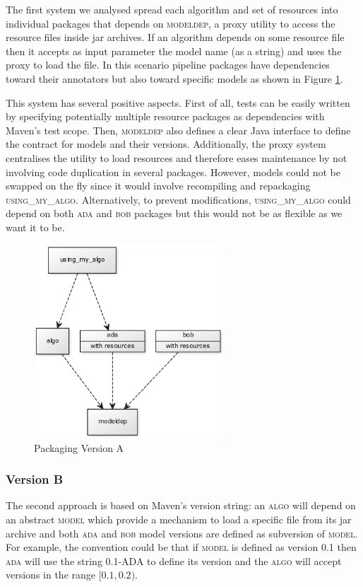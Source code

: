 \documentclass{article}
\newcommand{\id}[1]{\mbox{\textsc{#1}}}
\begin{document}
The first system we analysed spread each algorithm and set of resources into individual packages that depends on \id{modeldep}, a proxy utility to access the resource files inside jar archives. If an algorithm depends on some resource file then it accepts as input parameter the model name (as a string) and uses the proxy to load the file. In this scenario pipeline packages have dependencies toward their annotators but also toward specific models as shown in Figure \ref{fig:pkgsysA}.

This system has several positive aspects. First of all, tests can be easily written by specifying potentially multiple resource packages as dependencies with Maven's test scope. Then, \id{modeldep} also defines a clear Java interface to define the contract for models and their versions. Additionally, the proxy system centralises the utility to load resources and therefore eases maintenance by not involving code duplication in several packages. However, models could not be swapped on the fly since it would involve recompiling and repackaging \id{using\_my\_algo}.  Alternatively, to prevent modifications, \id{using\_my\_algo} could depend on both \id{ada} and \id{bob} packages but this would not be as flexible as we want it to be.

\begin{figure}
\centering
\includegraphics[width=200pt]{res/packaging_version_A.png}
\caption{Packaging Version A}
\label{fig:pkgsysA}
\end{figure}


\subsubsection{Version B}

The second approach is based on Maven's version string: an \id{algo} will depend on an abstract \id{model} which provide a mechanism to load a specific file from its jar archive and both \id{ada} and \id{bob} model versions are defined as subversion of \id{model}. For example, the convention could be that if \id{model} is defined as version \id{0.1} then \id{ada} will use the string \id{0.1-ADA} to define its version and the \id{algo} will accept versions in the range $ [0.1,0.2) $.
\end{document}
